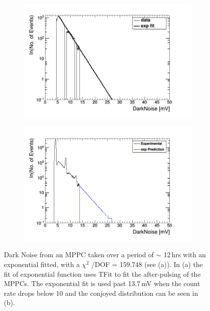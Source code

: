 \begin{figure}[!h]
\centering
\begin{subfigure}{.5\textwidth}
  \centering
  \includegraphics[width=\linewidth]{fit_of_dark_noise.png}
  \captionsetup{width=.9\linewidth}
  \caption{}
  \label{subFig:expFitOfDark}
\end{subfigure}%
\begin{subfigure}{.5\textwidth}
  \centering
  \includegraphics[width=\linewidth]{fittedDarkNoise_output.png}
  \captionsetup{width=.9\linewidth}
  \caption{}
  \label{subFig:fittedDarkNoise}
\end{subfigure}
\caption{Dark Noise from an MPPC taken over a period of $\sim$ 12\,hrs with an exponential fitted, with a $\chi ^2$ /DOF = 159.748 (see (a)). In (a) the fit of exponential function uses TFit to fit the after-pulsing of the MPPCs. The exponential fit is used past 13.7\,mV when the count rate drops below 10 and the conjoyed distribution can be seen in (b).}
\label{fig:fitting_of_non_peak_dark_noise}
\end{figure}

